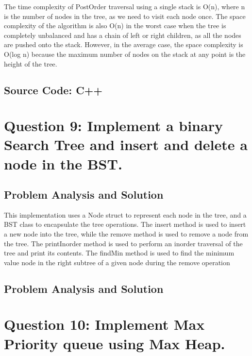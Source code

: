 \documentclass[a4paper]{article}
\begin{document}
The time complexity of PostOrder traversal using a single stack is O(n), where n is the number of nodes in the tree, as we need to visit each node once. The space complexity of the algorithm is also O(n) in the worst case when the tree is completely unbalanced and has a chain of left or right children, as all the nodes are pushed onto the stack. However, in the average case, the space complexity is O(log n) because the maximum number of nodes on the stack at any point is the height of the tree.


\subsection{Source Code: C++ }




\pagebreak


\section{\hspace{-0.5em}\textbf{ Question 9}: Implement a binary Search Tree and insert and delete a node in the BST.}
\subsection{Problem Analysis and Solution}
This implementation uses a Node struct to represent each node in the tree, and a BST class to encapsulate the tree operations. The insert method is used to insert a new node into the tree, while the remove method is used to remove a node from the tree. The printInorder method is used to perform an inorder traversal of the tree and print its contents. The findMin method is used to find the minimum value node in the right subtree of a given node during the remove operation

\subsection{Problem Analysis and Solution}


\pagebreak




\section{\hspace{-0.5em}\textbf{ Question 10}: Implement Max Priority queue using Max Heap.}
\end{document}
